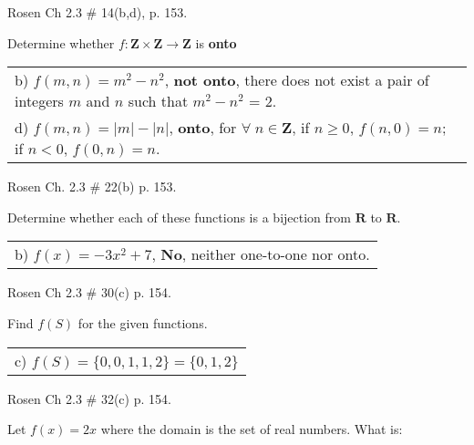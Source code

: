 \documentclass[11pt]{exam}
\begin{document}
\begin{questions}
\question Rosen Ch 2.3 \# 14(b,d), p. 153.
\begin{solution}
Determine whether $f: \mathbf{Z} \times \mathbf{Z} \rightarrow \mathbf{Z}$ is \textbf{onto}

\begin{tabular}{p{5in}}
  b) $f(m,n) = m^2 - n^2$, \textbf{not onto}, there does not exist a pair of integers $m$ and $n$ such that $m^2 - n^2$ = 2. \\
  d) $f(m,n) = |m| - |n|$, \textbf{onto}, for $\forall\; n \in \mathbf{Z}$, if $n\geq 0$, $f(n,0) = n$; if $n < 0$, $f(0,n) = n$. \\
\end{tabular}
\end{solution}

\question Rosen Ch. 2.3 \# 22(b) p. 153.
\begin{solution}
Determine whether each of these functions is a bijection from $\mathbf{R}$ to $\mathbf{R}$.

\begin{tabular}{l}
 b) $f(x) = -3x^2 + 7$, \textbf{No}, neither one-to-one nor onto. \\
\end{tabular}
\end{solution}


\question Rosen Ch 2.3 \# 30(c) p. 154.
\begin{solution}
Find $f(S)$ for the given functions.

\begin{tabular}{l}
  c) $f(S) = \{ 0, 0, 1, 1, 2 \} = \{0, 1, 2\}$ \\
\end{tabular}
\end{solution}

\question Rosen Ch 2.3 \# 32(c) p. 154. 
\begin{solution}
Let $f(x) = 2x$ where the domain is the set of real numbers. What is:


\end{solution}
\end{questions}
\end{document}
